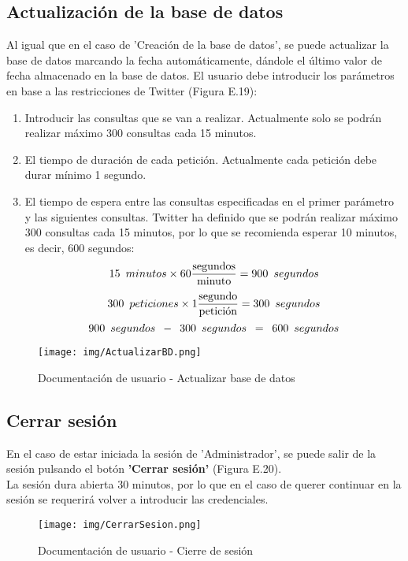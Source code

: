 \subsection{Actualización de la base de datos}
Al igual que en el caso de 'Creación de la base de datos', se puede actualizar la base de datos marcando la fecha automáticamente, dándole el último valor de fecha almacenado en la base de datos. El usuario debe introducir los parámetros en base a las restricciones de Twitter (Figura E.19):\\
\begin{enumerate}
     \item Introducir las consultas que se van a realizar. Actualmente solo se podrán realizar máximo 300 consultas cada 15 minutos.
    \item El tiempo de duración de cada petición. Actualmente cada petición debe durar mínimo 1 segundo.
    \item El tiempo de espera entre las consultas especificadas en el primer parámetro y las siguientes consultas. Twitter ha definido que se podrán realizar máximo 300 consultas cada 15 minutos, por lo que se recomienda esperar 10 minutos, es decir, 600 segundos:\\
    $$ 15\hspace{0.5em}minutos\times60\frac{\text{segundos}}{\text{minuto}}=900\hspace{0.5em}segundos $$
    $$ 300\hspace{0.5em}peticiones\times1\frac{\text{segundo}}{\text{petición}}=300\hspace{0.5em}segundos $$
    $$ 900\hspace{0.5em}segundos\hspace{0.5em}-\hspace{0.5em} 300\hspace{0.5em}segundos\hspace{0.5em}=\hspace{0.5em}600\hspace{0.5em}segundos$$
\end{enumerate}
\begin{figure}[h!]
    \centering
    \texttt{[image: img/ActualizarBD.png]} \\
    \caption{Documentación de usuario - Actualizar base de datos}
    \label{Documentación de usuario - Actualizar base de datos}
\end{figure}
\subsection{Cerrar sesión}
En el caso de estar iniciada la sesión de 'Administrador', se puede salir de la sesión pulsando el botón \textbf{'Cerrar sesión'} (Figura E.20).\\
La sesión dura abierta 30 minutos, por lo que en el caso de querer continuar en la sesión se requerirá volver a introducir las credenciales.
\begin{figure}[h!]
    \centering
    \texttt{[image: img/CerrarSesion.png]} \\
    \caption{Documentación de usuario - Cierre de sesión}
    \label{Documentación de usuario - Cierre de sesión}
\end{figure}

